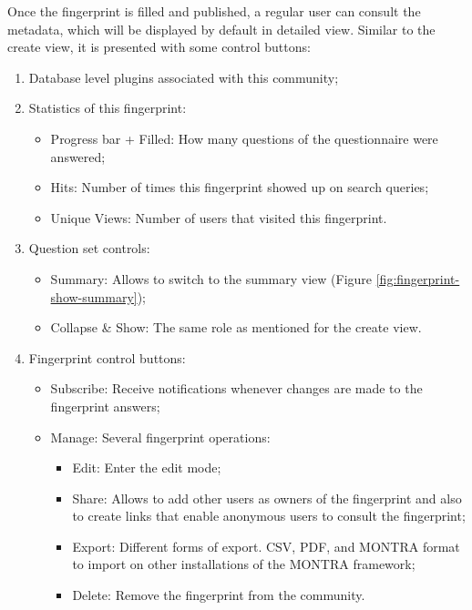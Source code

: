 Once the fingerprint is filled and published, a regular user can consult the metadata, which will be displayed by default in detailed view.
Similar to the create view, it is presented with some control buttons:

\begin{enumerate}
    \item Database level plugins associated with this community;
    \item Statistics of this fingerprint:
        \begin{itemize}
            \item Progress bar + Filled: How many questions of the questionnaire were answered;
            \item Hits: Number of times this fingerprint showed up on search queries;
            \item Unique Views: Number of users that visited this fingerprint.
        \end{itemize}
    \item Question set controls:
        \begin{itemize}
            \item Summary: Allows to switch to the summary view (Figure \ref{fig:fingerprint-show-summary});
            \item Collapse \& Show: The same role as mentioned for the create view.
        \end{itemize}
    \item Fingerprint control buttons:
        \begin{itemize}
            \item Subscribe: Receive notifications whenever changes are made to the fingerprint answers;
            \item Manage: Several fingerprint operations:
                \begin{itemize}
                    \item Edit: Enter the edit mode;
                    \item Share: Allows to add other users as owners of the fingerprint and also to create links that enable anonymous users to consult the fingerprint;
                    \item Export: Different forms of export. CSV, PDF, and MONTRA format to import on other installations of the MONTRA framework;
                    \item Delete: Remove the fingerprint from the community.
                \end{itemize}
        \end{itemize}
\end{enumerate}

